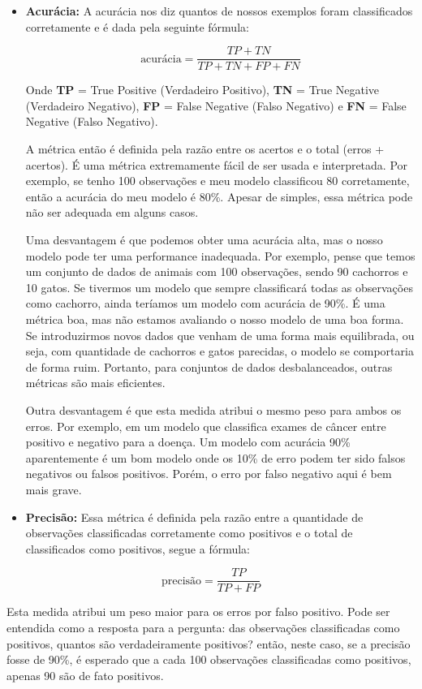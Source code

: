 \documentclass[
  letterpaper,
  DIV=11,
  numbers=noendperiod]{scrreprt}
\begin{document}
\begin{itemize}
\item
  \textbf{Acurácia:} A acurácia nos diz quantos de nossos exemplos foram
  classificados corretamente e é dada pela seguinte fórmula:

  \[
  \mbox{acurácia}   =  \frac{TP + TN}{TP + TN + FP + FN}
  \]

  Onde \textbf{TP} = True Positive (Verdadeiro Positivo), \textbf{TN} =
  True Negative (Verdadeiro Negativo), \textbf{FP} = False Negative
  (Falso Negativo) e \textbf{FN} = False Negative (Falso Negativo).

  A métrica então é definida pela razão entre os acertos e o total
  (erros + acertos). É uma métrica extremamente fácil de ser usada e
  interpretada. Por exemplo, se tenho 100 observações e meu modelo
  classificou 80 corretamente, então a acurácia do meu modelo é 80\%.
  Apesar de simples, essa métrica pode não ser adequada em alguns casos.

  Uma desvantagem é que podemos obter uma acurácia alta, mas o nosso
  modelo pode ter uma performance inadequada. Por exemplo, pense que
  temos um conjunto de dados de animais com 100 observações, sendo 90
  cachorros e 10 gatos. Se tivermos um modelo que sempre classificará
  todas as observações como cachorro, ainda teríamos um modelo com
  acurácia de 90\%. É uma métrica boa, mas não estamos avaliando o nosso
  modelo de uma boa forma. Se introduzirmos novos dados que venham de
  uma forma mais equilibrada, ou seja, com quantidade de cachorros e
  gatos parecidas, o modelo se comportaria de forma ruim. Portanto, para
  conjuntos de dados desbalanceados, outras métricas são mais
  eficientes.

  Outra desvantagem é que esta medida atribui o mesmo peso para ambos os
  erros. Por exemplo, em um modelo que classifica exames de câncer entre
  positivo e negativo para a doença. Um modelo com acurácia 90\%
  aparentemente é um bom modelo onde os 10\% de erro podem ter sido
  falsos negativos ou falsos positivos. Porém, o erro por falso negativo
  aqui é bem mais grave.
\item
  \textbf{Precisão:} Essa métrica é definida pela razão entre a
  quantidade de observações classificadas corretamente como positivos e
  o total de classificados como positivos, segue a fórmula:
\end{itemize}

\[
\mbox{precisão}  =  \frac{TP}{TP + FP}
\]

Esta medida atribui um peso maior para os erros por falso positivo. Pode
ser entendida como a resposta para a pergunta: das observações
classificadas como positivos, quantos são verdadeiramente positivos?
então, neste caso, se a precisão fosse de 90\%, é esperado que a cada
100 observações classificadas como positivos, apenas 90 são de fato
positivos.
\end{document}
